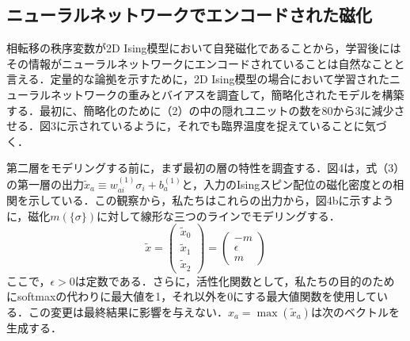 \documentclass[a4paper,11pt]{jsreport}
\begin{document}
\subsection{ニューラルネットワークでエンコードされた磁化}
相転移の秩序変数が2D Ising模型において自発磁化であることから，学習後にはその情報がニューラルネットワークにエンコードされていることは自然なことと言える．定量的な論拠を示すために，2D Ising模型の場合において学習されたニューラルネットワークの重みとバイアスを調査して，簡略化されたモデルを構築する．最初に、簡略化のために（2）の中の隠れユニットの数を80から3に減少させる．図3に示されているように，それでも臨界温度を捉えていることに気づく．\par
第二層をモデリングする前に，まず最初の層の特性を調査する．図4は，式（3）の第一層の出力$\tilde{x}_a \equiv w_{ai}^{(1)}\sigma_i + b_a^{(1)}$と，入力のIsingスピン配位の磁化密度との相関を示している．この観察から，私たちはこれらの出力から，図4bに示すように，磁化$m(\{ \sigma \})$に対して線形な三つのラインでモデリングする．
\begin{equation}
  \tilde{x} =
  \begin{pmatrix}
    \tilde{x}_0 \\ \tilde{x}_1 \\ \tilde{x}_2
  \end{pmatrix}
  =
  \begin{pmatrix}
    -m \\ \epsilon \\ m
  \end{pmatrix}
\end{equation}
ここで，$\epsilon > 0$は定数である．さらに，活性化関数として，私たちの目的のためにsoftmaxの代わりに最大値を1，それ以外を0にする最大値関数を使用している．この変更は最終結果に影響を与えない．$x_a = \max{(\tilde{x}_a)}$は次のベクトルを生成する．
\end{document}
